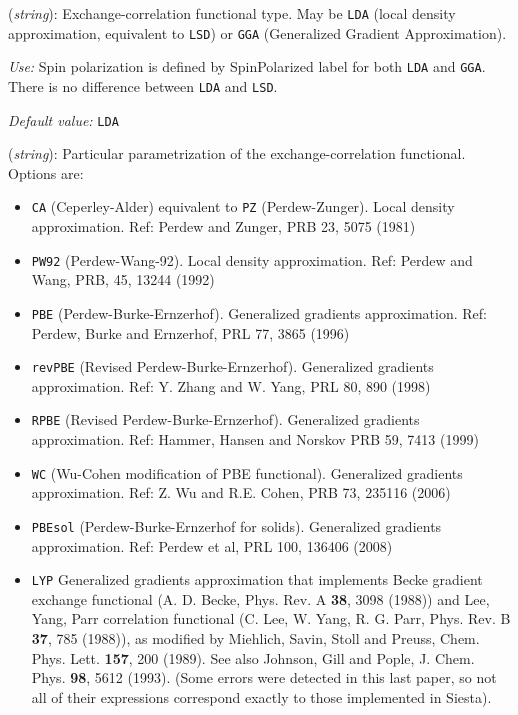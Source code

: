 \documentclass[11pt]{article}
\begin{document}
\begin{description}
\itemsep 10pt
\parsep 0pt

\item[{\bf XC.functional}] ({\it string}): 
Exchange-correlation functional type. May be {\tt LDA} 
(local density approximation, equivalent to {\tt LSD}) or 
{\tt GGA} (Generalized Gradient Approximation). 

{\it Use:} Spin polarization is defined by SpinPolarized label for
both {\tt LDA} and {\tt GGA}. There is no difference between {\tt LDA}
and {\tt LSD}.

{\it Default value:} {\tt LDA}
        

\item[{\bf XC.authors}] ({\it string}): 
Particular parametrization of the
exchange-correlation functional. Options are:
\begin{itemize}
\item {\tt CA} (Ceperley-Alder) 
equivalent to {\tt PZ} (Perdew-Zunger). 
Local density approximation.
Ref: Perdew and Zunger, PRB 23, 5075 (1981)
\item {\tt PW92} (Perdew-Wang-92). 
Local density approximation.
Ref: Perdew and Wang, PRB, 45, 13244 (1992)
\item {\tt PBE} (Perdew-Burke-Ernzerhof). Generalized gradients
approximation.  Ref: Perdew, Burke and Ernzerhof, PRL 77, 3865
(1996) 
\item {\tt revPBE} (Revised Perdew-Burke-Ernzerhof). Generalized gradients
approximation.  Ref: Y. Zhang and W. Yang, PRL 80, 890 
(1998) 
\item {\tt RPBE} (Revised Perdew-Burke-Ernzerhof). Generalized gradients
approximation.  Ref: Hammer, Hansen and Norskov PRB 59, 7413 
(1999) 
\item {\tt WC} (Wu-Cohen modification of PBE functional). Generalized gradients
approximation.  Ref: Z. Wu and R.E. Cohen, PRB 73, 235116 (2006)
 
\item {\tt PBEsol} (Perdew-Burke-Ernzerhof for solids). Generalized gradients
approximation.  Ref: Perdew et al, PRL 100, 136406
(2008) 
\item {\tt LYP} Generalized gradients approximation 
that implements Becke gradient exchange functional (A. D.
Becke, Phys. Rev. A {\bf 38}, 3098 (1988)) and Lee, Yang, Parr
correlation functional (C. Lee, W. Yang, R. G. Parr, Phys. Rev. B
{\bf 37}, 785 (1988)), as modified by Miehlich, Savin, Stoll and Preuss,
Chem. Phys. Lett. {\bf 157}, 200 (1989). See also Johnson, Gill and Pople,
J. Chem. Phys. {\bf 98}, 5612 (1993). (Some errors were detected in this
last paper, so not all of their expressions correspond exactly to those
implemented in {\sc Siesta}).


\end{itemize}
\end{description}
\end{document}
